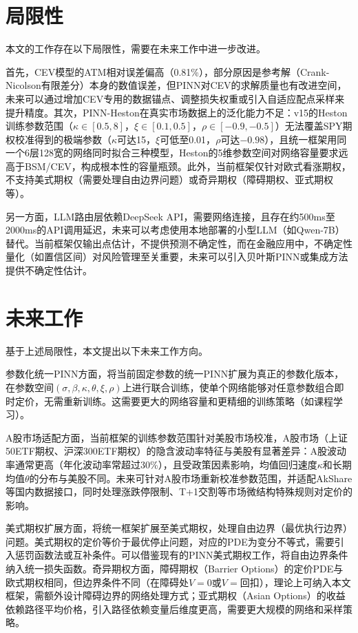 \section{局限性}\label{sec:limitations}

本文的工作存在以下局限性，需要在未来工作中进一步改进。

首先，CEV模型的ATM相对误差偏高（0.81\%），部分原因是参考解（Crank-Nicolson有限差分）本身的数值误差，但PINN对CEV的求解质量也有改进空间，未来可以通过增加CEV专用的数据锚点、调整损失权重或引入自适应配点采样来提升精度。其次，PINN-Heston在真实市场数据上的泛化能力不足：v15的Heston训练参数范围（$\kappa\in[0.5,8]$，$\xi\in[0.1,0.5]$，$\rho\in[-0.9,-0.5]$）无法覆盖SPY期权校准得到的极端参数（$\kappa$可达15，$\xi$可低至0.01，$\rho$可达$-0.98$），且统一框架用同一个6层128宽的网络同时拟合三种模型，Heston的5维参数空间对网络容量要求远高于BSM/CEV，构成根本性的容量瓶颈。此外，当前框架仅针对欧式看涨期权，不支持美式期权（需要处理自由边界问题）或奇异期权（障碍期权、亚式期权等）。

另一方面，LLM路由层依赖DeepSeek API，需要网络连接，且存在约500ms至2000ms的API调用延迟，未来可以考虑使用本地部署的小型LLM（如Qwen-7B）替代。当前框架仅输出点估计，不提供预测不确定性，而在金融应用中，不确定性量化（如置信区间）对风险管理至关重要，未来可以引入贝叶斯PINN或集成方法提供不确定性估计。

\section{未来工作}\label{sec:future}

基于上述局限性，本文提出以下未来工作方向。

参数化统一PINN方面，将当前固定参数的统一PINN扩展为真正的参数化版本，在参数空间$(\sigma,\beta,\kappa,\theta,\xi,\rho)$上进行联合训练，使单个网络能够对任意参数组合即时定价，无需重新训练。这需要更大的网络容量和更精细的训练策略（如课程学习）。

A股市场适配方面，当前框架的训练参数范围针对美股市场校准，A股市场（上证50ETF期权、沪深300ETF期权）的隐含波动率特征与美股有显著差异：A股波动率通常更高（年化波动率常超过30\%），且受政策因素影响，均值回归速度$\kappa$和长期均值$\theta$的分布与美股不同。未来可针对A股市场重新校准参数范围，并适配AkShare等国内数据接口，同时处理涨跌停限制、T+1交割等市场微结构特殊规则对定价的影响。

美式期权扩展方面，将统一框架扩展至美式期权，处理自由边界（最优执行边界）问题。美式期权的定价等价于最优停止问题，对应的PDE为变分不等式，需要引入惩罚函数法或互补条件。可以借鉴现有的PINN美式期权工作\cite{louskos2021american}，将自由边界条件纳入统一损失函数。奇异期权方面，障碍期权（Barrier Options）的定价PDE与欧式期权相同，但边界条件不同（在障碍处$V=0$或$V=\text{回扣}$），理论上可纳入本文框架，需额外设计障碍边界的网络处理方式；亚式期权（Asian Options）的收益依赖路径平均价格，引入路径依赖变量后维度更高，需要更大规模的网络和采样策略。

